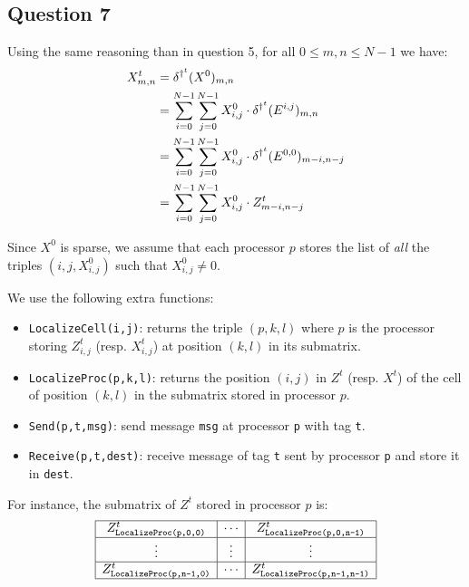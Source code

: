 \subsection*{Question 7}

Using the same reasoning than in question 5, for all $0 \leq m, n \leq N-1$ we have:
\begin{equation}
 \label{qsevenrel}
 \begin{split}
    X^t_{m,n} & = \delta^{\dag^t} (X^0)_{m,n} \\
              & = \sum_{i=0}^{N-1} \sum_{j=0}^{N-1} X^0_{i,j} \cdot \delta^{\dag^t} (E^{i,j})_{m,n} \\
              & = \sum_{i=0}^{N-1} \sum_{j=0}^{N-1} X^0_{i,j} \cdot \delta^{\dag^t} (E^{0,0})_{m-i,n-j} \\
              & = \sum_{i=0}^{N-1} \sum_{j=0}^{N-1} X^0_{i,j} \cdot Z^t_{m-i,n-j} \\
 \end{split}
\end{equation}

Since $X^0$ is sparse, we assume that each processor $p$ stores the list of \textit{all} the triples $(i,j,X^0_{i,j})$ such that $X^0_{i,j} \neq 0$.

We use the following extra functions:
\begin{itemize}
 \item \texttt{LocalizeCell(i,j)}: returns the triple $(p,k,l)$ where $p$ is the processor storing $Z^t_{i,j}$ (resp. $X^t_{i,j}$) at position $(k,l)$ in its submatrix.
 \item \texttt{LocalizeProc(p,k,l)}: returns the position $(i,j)$ in $Z^t$ (resp. $X^t$) of the cell of position $(k,l)$ in the submatrix stored in processor $p$.
 \item \texttt{Send(p,t,msg)}: send message \texttt{msg} at processor \texttt{p} with tag \texttt{t}.
 \item \texttt{Receive(p,t,dest)}: receive message of tag \texttt{t} sent by processor \texttt{p} and store it in \texttt{dest}.
\end{itemize}

For instance, the submatrix of $Z^t$ stored in processor $p$ is:
\[
   \begin{array}{ | c | c | c |} \hline
    Z^t_{\texttt{LocalizeProc(p,0,0)}} & \cdots & Z^t_{\texttt{LocalizeProc(p,0,n-1)}}\\ \hline
    \vdots & \vdots & \vdots \\ \hline
    Z^t_{\texttt{LocalizeProc(p,n-1,0)}} & \cdots & Z^t_{\texttt{LocalizeProc(p,n-1,n-1)}}\\ \hline
  \end{array}
\]

